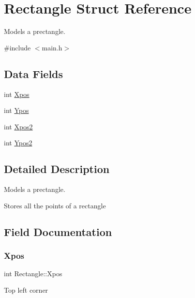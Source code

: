 \hypertarget{struct_rectangle}{}\section{Rectangle Struct Reference}
\label{struct_rectangle}


Models a prectangle.  




{\ttfamily \#include $<$main.\+h$>$}

\subsection*{Data Fields}
\begin{DoxyCompactItemize}
\item 
int \hyperlink{struct_rectangle_afec44d723041ed9aafdd6ca2052816d6}{Xpos}
\item 
int \hyperlink{struct_rectangle_a4ae94fb818ea9b5b459a9ee3e058bc29}{Ypos}
\item 
int \hyperlink{struct_rectangle_a77f791adbe5bfda2a05b6f61851e073d}{Xpos2}
\item 
int \hyperlink{struct_rectangle_a27c67ab1ffe0dbb8256a649fecb759eb}{Ypos2}
\end{DoxyCompactItemize}


\subsection{Detailed Description}
Models a prectangle. 

Stores all the points of a rectangle 

\subsection{Field Documentation}
\mbox{\label{struct_rectangle_afec44d723041ed9aafdd6ca2052816d6}} 
\subsubsection{\texorpdfstring{Xpos}{Xpos}}
{\footnotesize\ttfamily int Rectangle\+::\+Xpos}

Top left corner \mbox{\label{struct_rectangle_a77f791adbe5bfda2a05b6f61851e073d}} 
